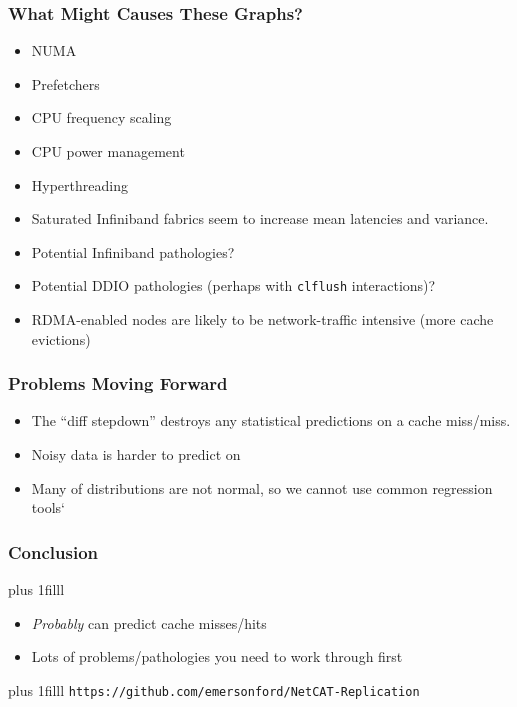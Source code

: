 \documentclass{beamer}
\begin{document}
\begin{frame}
 \frametitle{What Might Causes These Graphs?}
 \begin{itemize}
  \item NUMA
  \item Prefetchers
  \item CPU frequency scaling
  \item CPU power management
  \item Hyperthreading
  \item Saturated Infiniband fabrics seem to increase mean latencies and variance.
  \item Potential Infiniband pathologies?
  \item Potential DDIO pathologies (perhaps with \texttt{clflush} interactions)?
  \item RDMA-enabled nodes are likely to be network-traffic intensive (more cache evictions)
 \end{itemize}
\end{frame}

\begin{frame}
 \frametitle{Problems Moving Forward}
 \begin{itemize}
  \item The ``diff stepdown'' destroys any statistical predictions on a cache miss/miss.
  \item Noisy data is harder to predict on
  \item Many of distributions are not normal, so we cannot use common regression tools`
 \end{itemize}
\end{frame}


\begin{frame}
 \frametitle{Conclusion}
 \vskip0pt plus 1filll
 \begin{itemize}
  \item \textit{Probably} can predict cache misses/hits
  \item Lots of problems/pathologies you need to work through first
 \end{itemize}

 \vskip0pt plus 1filll
 \centering
 \footnotesize
 \texttt{https://github.com/emersonford/NetCAT-Replication}
 \vspace{20pt}

\end{frame}
\end{document}
